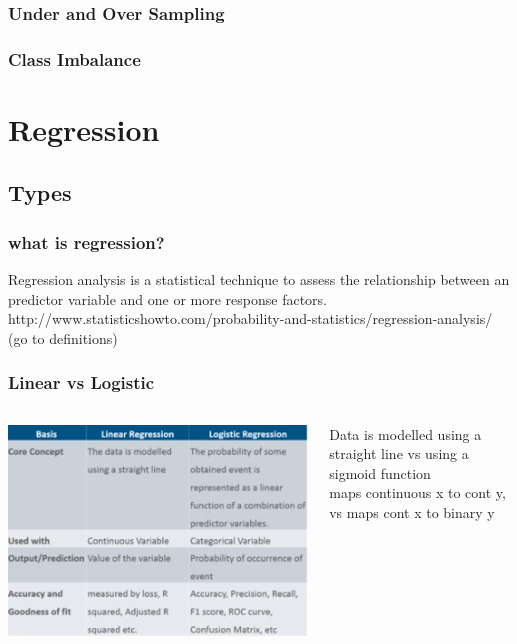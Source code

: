 \documentclass{beamer}
\begin{document}
\begin{frame}\frametitle{Under and Over Sampling}
\end{frame}


\begin{frame}\frametitle{Class Imbalance}
\end{frame}

\section{Regression}


\subsection{Types}

\begin{frame}\frametitle{what is regression?}
	Regression analysis is a statistical technique to assess the relationship between an predictor variable and one or more response factors.\\
	http://www.statisticshowto.com/probability-and-statistics/regression-analysis/
	(go to definitions)
\end{frame}


\begin{frame}\frametitle{Linear vs Logistic}
	\begin{columns}
		\begin{column}{0.6\textwidth}
			\includegraphics[scale=0.45]{regression/linearlogistic}
		\end{column}
		\begin{column}{0.2\textwidth}
			Data is modelled using a straight line vs using a sigmoid function\\
			maps continuous x to cont y, vs maps cont x to binary y 
		\end{column}
	\end{columns}

\end{frame}
\end{document}
